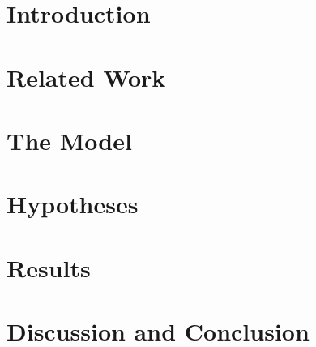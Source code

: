 \section{Introduction}


\section{Related Work}


\section{The Model}


\section{Hypotheses}


\section{Results}


\section{Discussion and Conclusion}



